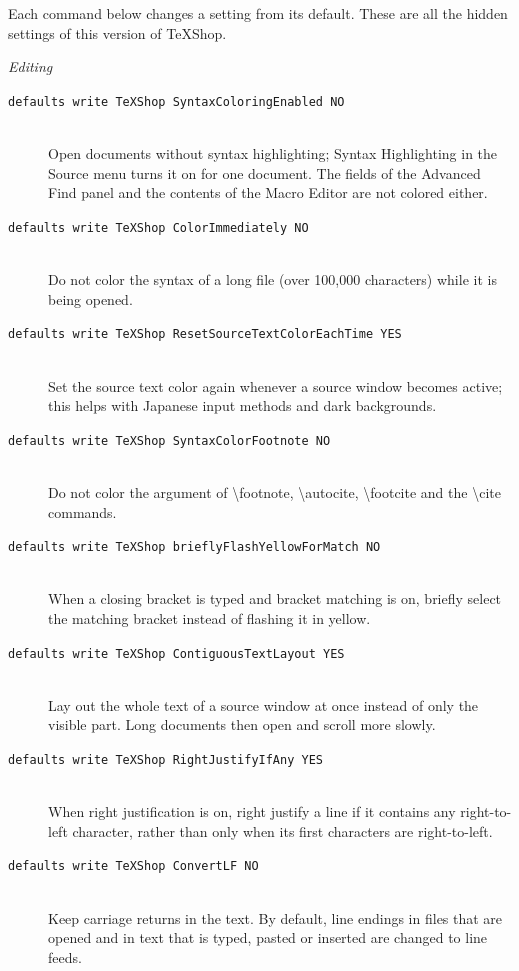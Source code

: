 \documentclass[11pt, oneside]{article}   	%
\begin{document}
Each command below changes a setting from its default. These are all the hidden settings of this version of TeXShop.

\newpage
{\em Editing}
\begin{description}
\item[\texttt{defaults write TeXShop SyntaxColoringEnabled NO}] \hfill \\
Open documents without syntax highlighting; Syntax Highlighting in the Source menu turns it on for one document. The fields of the Advanced Find panel and the contents of the Macro Editor are not colored either.
\item[\texttt{defaults write TeXShop ColorImmediately NO}] \hfill \\
Do not color the syntax of a long file (over 100,000 characters) while it is being opened.
\item[\texttt{defaults write TeXShop ResetSourceTextColorEachTime YES}] \hfill \\
Set the source text color again whenever a source window becomes active; this helps with Japanese input methods and dark backgrounds.
\item[\texttt{defaults write TeXShop SyntaxColorFootnote NO}] \hfill \\
Do not color the argument of \textbackslash footnote, \textbackslash autocite, \textbackslash footcite and the \textbackslash cite commands.
\item[\texttt{defaults write TeXShop brieflyFlashYellowForMatch NO}] \hfill \\
When a closing bracket is typed and bracket matching is on, briefly select the matching bracket instead of flashing it in yellow.
\item[\texttt{defaults write TeXShop ContiguousTextLayout YES}] \hfill \\
Lay out the whole text of a source window at once instead of only the visible part. Long documents then open and scroll more slowly.
\item[\texttt{defaults write TeXShop RightJustifyIfAny YES}] \hfill \\
When right justification is on, right justify a line if it contains any right-to-left character, rather than only when its first characters are right-to-left.
\item[\texttt{defaults write TeXShop ConvertLF NO}] \hfill \\
Keep carriage returns in the text. By default, line endings in files that are opened and in text that is typed, pasted or inserted are changed to line feeds.

\end{description}
\end{document}
